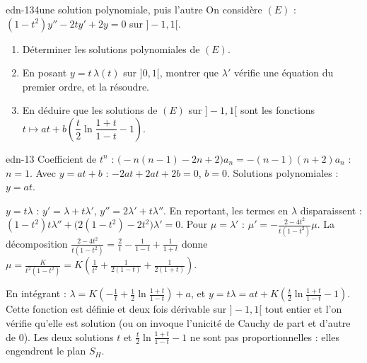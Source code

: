 \begin{exo}{edn-13}{4}{une solution polynomiale, puis l'autre}
On considère $(E)$ : $(1-t^2)y''-2ty'+2y=0$ sur $]-1,1[$.
\begin{enumerate}
\item Déterminer les solutions polynomiales de $(E)$.
\item En posant $y=t\,\lambda(t)$ sur $]0,1[$, montrer que $\lambda'$ vérifie une équation du premier ordre, et la résoudre.
\item En déduire que les solutions de $(E)$ sur $]-1,1[$ sont les fonctions $t\mapsto at+b\left(\dfrac t2\ln\dfrac{1+t}{1-t}-1\right)$.
\end{enumerate}
\end{exo}
\begin{corrige}{edn-13}
 Coefficient de $t^n$ : $\big(-n(n-1)-2n+2\big)a_n=-(n-1)(n+2)a_n$ : $n=1$. Avec $y=at+b$ : $-2at+2at+2b=0$, $b=0$. Solutions polynomiales : $y=at$.

 $y=t\lambda$ : $y'=\lambda+t\lambda'$, $y''=2\lambda'+t\lambda''$. En reportant, les termes en $\lambda$ disparaissent :
$(1-t^2)t\lambda''+\big(2(1-t^2)-2t^2\big)\lambda'=0$. Pour $\mu=\lambda'$ : $\mu'=-\frac{2-4t^2}{t(1-t^2)}\mu$. La décomposition
$\frac{2-4t^2}{t(1-t^2)}=\frac2t-\frac1{1-t}+\frac1{1+t}$ donne $\mu=\frac K{t^2(1-t^2)}=K\left(\frac1{t^2}+\frac1{2(1-t)}+\frac1{2(1+t)}\right)$.

 En intégrant : $\lambda=K\left(-\frac1t+\frac12\ln\frac{1+t}{1-t}\right)+a$, et $y=t\lambda=at+K\left(\frac t2\ln\frac{1+t}{1-t}-1\right)$.
Cette fonction est définie et deux fois dérivable sur $]-1,1[$ tout entier et l'on vérifie qu'elle est solution (ou on invoque
l'unicité de Cauchy de part et d'autre de $0$). Les deux solutions $t$ et $\frac t2\ln\frac{1+t}{1-t}-1$ ne sont pas
proportionnelles : elles engendrent le plan $S_H$.
\end{corrige}

